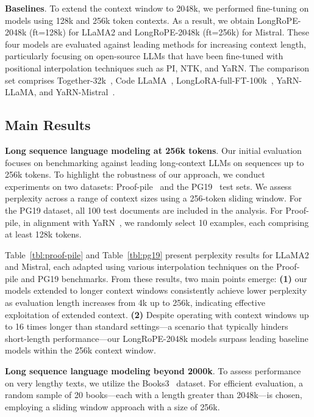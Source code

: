 \textbf{Baselines}. To extend the context window to 2048k, we performed fine-tuning on models using 128k and 256k token contexts. As a result, we obtain LongRoPE-2048k (ft=128k) for LLaMA2 and LongRoPE-2048k (ft=256k) for Mistral. These four models are evaluated against leading methods for increasing context length, particularly focusing on open-source LLMs that have been fine-tuned with positional interpolation techniques such as PI, NTK, and YaRN. The comparison set comprises Together-32k~\cite{together}, Code LLaMA~\cite{codellama}, LongLoRA-full-FT-100k~\cite{longlora}, YaRN-LLaMA, and YaRN-Mistral~\cite{yarn}.

\subsection{Main Results}

\label{sec:mainresult}
\textbf{Long sequence language modeling at 256k tokens}. Our initial evaluation focuses on benchmarking against leading long-context LLMs on sequences up to 256k tokens. To highlight the robustness of our approach, we conduct experiments on two datasets: Proof-pile~\cite{pg19} and the PG19~\cite{pile} test sets. We assess perplexity across a range of context sizes using a 256-token sliding window. For the PG19 dataset, all 100 test documents are included in the analysis. For Proof-pile, in alignment with YaRN~\cite{yarn}, we randomly select 10 examples, each comprising at least 128k tokens.

Table~\ref{tbl:proof-pile} and Table~\ref{tbl:pg19} present perplexity results for LLaMA2 and Mistral, each adapted using various interpolation techniques on the Proof-pile and PG19 benchmarks. From these results, two main points emerge: \textbf{(1)} our models extended to longer context windows consistently achieve lower perplexity as evaluation length increases from 4k up to 256k, indicating effective exploitation of extended context. \textbf{(2)} Despite operating with context windows up to 16 times longer than standard settings—a scenario that typically hinders short-length performance—our LongRoPE-2048k models surpass leading baseline models within the 256k context window.

\textbf{Long sequence language modeling beyond 2000k}. To assess performance on very lengthy texts, we utilize the Books3~\cite{pile} dataset. For efficient evaluation, a random sample of 20 books—each with a length greater than 2048k—is chosen, employing a sliding window approach with a size of 256k.

